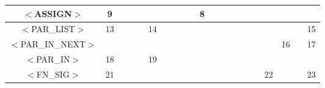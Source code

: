 \documentclass[a4paper,11pt]{article}
\begin{document}
\begin{table}[htbp]
\begin{tabular}{|c|c|c|c|c|c|c|c|c|c|c|c|c|c|c|c|c|c|c|c|c|}
\hline
$<$ASSIGN$>$        & \multicolumn{1}{c|}{9}      &                        &                        &                         &                           &                             &                              &                             &                             & \multicolumn{1}{c|}{8}   &                           &                         &                          &                          &                            &                         &                             &                         &                           & \multicolumn{1}{l|}{}  \\ 
\hline
$<$PAR\_LIST$>$     & \multicolumn{1}{c|}{13}     &                        &                        &                         & \multicolumn{1}{c|}{14}   &                             &                              &                             &                             &                          &                           &                         &                          &                          &                            &                         &                             &                         &                           & 15                     \\ 
\hline
$<$PAR\_IN\_NEXT$>$ &                             &                        &                        &                         &                           &                             &                              &                             &                             &                          &                           &                         &                          &                          &                            &                         &                             & \multicolumn{1}{c|}{16} &                           & 17                     \\ 
\hline
$<$PAR\_IN$>$       & \multicolumn{1}{c|}{18}     &                        &                        &                         & \multicolumn{1}{c|}{19}   &                             &                              &                             &                             &                          &                           &                         &                          &                          &                            &                         &                             &                         &                           & \multicolumn{1}{l|}{}  \\ 
\hline
$<$FN\_SIG$>$       & \multicolumn{1}{c|}{21}     &                        &                        &                         &                           &                             &                              &                             &                             &                          &                           &                         &                          &                          &                            &                         & \multicolumn{1}{c|}{22}     &                         &                           & 23                     \\ 

\end{tabular}
\end{table}
\end{document}

